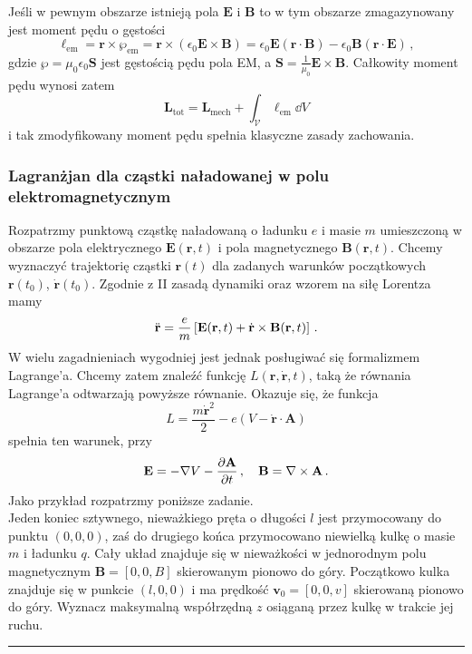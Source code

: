 \documentclass[../main.tex]{subfiles}
\begin{document}
Jeśli w pewnym obszarze istnieją pola \(\mathbf{E}\) i \(\mathbf{B}\) to w tym obszarze zmagazynowany jest moment pędu o gęstości
\begin{equation*}
    \boldsymbol{\ell}_\text{em}=\mathbf{r}\times\boldsymbol{\wp}_\text{em}=\mathbf{r}\times(\epsilon_0\mathbf{E}\times\mathbf{B})=\epsilon_0\mathbf{E}(\mathbf{r}\cdot\mathbf{B})-\epsilon_0\mathbf{B}(\mathbf{r}\cdot\mathbf{E})\,,
\end{equation*}
gdzie \(\boldsymbol{\wp}=\mu_0\epsilon_0\mathbf{S}\) jest gęstością pędu pola EM, a \(\mathbf{S}=\frac{1}{\mu_0}\mathbf{E}\times\mathbf{B}\). Całkowity moment pędu wynosi zatem
\begin{equation*}
    \mathbf{L}_\text{tot}=\mathbf{L}_\text{mech}+\int_\mathcal{V}\boldsymbol{\ell}_\text{em}\dd{V}
\end{equation*}
i tak zmodyfikowany moment pędu spełnia klasyczne zasady zachowania.
\subsubsection{Lagranżjan dla cząstki naładowanej w polu elektromagnetycznym}
Rozpatrzmy punktową cząstkę naładowaną o ładunku \(e\) i masie \(m\) umieszczoną w obszarze pola elektrycznego \(\mathbf{E}(\mathbf{r},t)\) i pola magnetycznego \(\mathbf{B}(\mathbf{r},t)\). Chcemy wyznaczyć trajektorię cząstki \(\mathbf{r}(t)\) dla zadanych warunków początkowych \(\mathbf{r}(t_0)\), \(\dot{\mathbf{r}}(t_0)\). Zgodnie z II zasadą dynamiki oraz wzorem na siłę Lorentza mamy
\begin{equation*}
    \Ddot{\mathbf{r}}=\frac{e}{m}\left[\mathbf{E}(\mathbf{r},t)+\dot{\mathbf{r}}\times\mathbf{B}(\mathbf{r},t)\right]\,.
\end{equation*}
W wielu zagadnieniach wygodniej jest jednak posługiwać się formalizmem Lagrange'a. Chcemy zatem znaleźć funkcję \(L(\mathbf{r},\dot{\mathbf{r}},t)\), taką że równania Lagrange'a odtwarzają powyższe równanie. Okazuje się, że funkcja
\begin{equation*}
    L=\frac{m\dot{\mathbf{r}}^2}{2}-e(V-\dot{\mathbf{r}}\cdot\mathbf{A})
\end{equation*}
spełnia ten warunek, przy
\begin{equation*}
    \mathbf{E}=-\nabla V-\pdv{\mathbf{A}}{t}\,,\quad \mathbf{B}=\nabla\times\mathbf{A}\,.
\end{equation*}
Jako przykład rozpatrzmy poniższe zadanie.\\

Jeden koniec sztywnego, nieważkiego pręta o długości \(l\) jest przymocowany do punktu \((0,0,0)\), zaś do drugiego końca przymocowano niewielką kulkę o masie \(m\) i ładunku \(q\). Cały układ znajduje się w nieważkości w jednorodnym polu magnetycznym \(\mathbf{B}=[0,0,B]\) skierowanym pionowo do góry. Początkowo kulka znajduje się w punkcie \((l,0,0)\) i ma prędkość \(\mathbf{v}_0=[0,0,v]\) skierowaną pionowo do góry. Wyznacz maksymalną współrzędną \(z\) osiąganą przez kulkę w trakcie jej ruchu.\\
\noindent\rule{\linewidth}{1pt}\\
\end{document}

